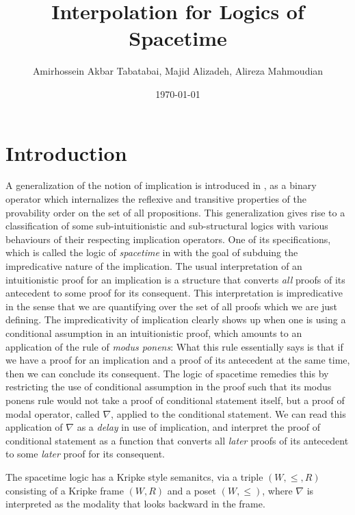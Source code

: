 \documentclass[12pt,a4paper]{article}
\begin{document}
    
\title{Interpolation for Logics of Spacetime}
\author[]{Amirhossein Akbar Tabatabai, Majid Alizadeh, Alireza Mahmoudian}
\affil[]{ }
\date{\today}
\maketitle

\section{Introduction}
A generalization of the notion of implication is introduced in \cite{amir}, as a binary operator which internalizes the reflexive and transitive properties of the provability order on the set of all propositions. This generalization gives rise to a classification of some sub-intuitionistic and sub-structural logics with various behaviours of their respecting implication operators. One of its specifications, which is called the logic of \emph{spacetime} in \cite{amir} with the goal of subduing the impredicative nature of the implication. The usual interpretation of an intuitionistic proof for an implication is a structure that converts \emph{all} proofs of its antecedent to some proof for its consequent. This interpretation is impredicative in the sense that we are quantifying over the set of all proofs which we are just defining. The impredicativity of implication clearly shows up when one is using a conditional assumption in an intuitionistic proof, which amounts to an application of the rule of \emph{modus ponens}: What this rule essentially says is that if we have a proof for an implication and a proof of its antecedent at the same time, then we can conclude its consequent. The logic of spacetime remedies this by restricting the use of conditional assumption in the proof such that its modus ponens rule would not take a proof of conditional statement itself, but a proof of modal operator, called $\nabla$, applied to the conditional statement. We can read this application of $\nabla$ as a \emph{delay} in use of implication, and interpret the proof of conditional statement as a function that converts all \emph{later} proofs of its antecedent to some \emph{later} proof for its consequent.

The spacetime logic has a Kripke style semanitcs, via a triple $(W, \leq, R)$ consisting of a Kripke frame $(W, R)$ and a poset $(W, \leq)$, where $\nabla$ is interpreted as the modality that looks backward in the frame.\\
\end{document}

